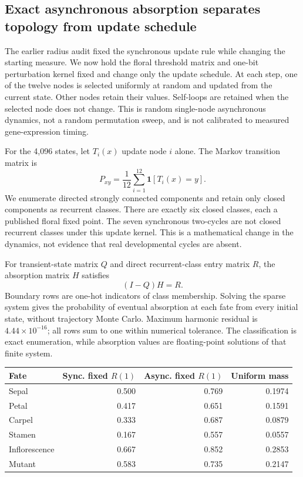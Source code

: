 \subsection{Exact asynchronous absorption separates topology from update schedule}

The earlier radius audit fixed the synchronous update rule while changing the starting measure. We now hold the floral threshold matrix and one-bit perturbation kernel fixed and change only the update schedule. At each step, one of the twelve nodes is selected uniformly at random and updated from the current state. Other nodes retain their values. Self-loops are retained when the selected node does not change. This is random single-node asynchronous dynamics, not a random permutation sweep, and is not calibrated to measured gene-expression timing.

For the 4,096 states, let $T_i(x)$ update node $i$ alone. The Markov transition matrix is
\[
P_{xy}=\frac{1}{12}\sum_{i=1}^{12}\mathbf{1}[T_i(x)=y].
\]
We enumerate directed strongly connected components and retain only closed components as recurrent classes. There are exactly six closed classes, each a published floral fixed point. The seven synchronous two-cycles are not closed recurrent classes under this update kernel. This is a mathematical change in the dynamics, not evidence that real developmental cycles are absent.

For transient-state matrix $Q$ and direct recurrent-class entry matrix $R$, the absorption matrix $H$ satisfies
\[
(I-Q)H=R.
\]
Boundary rows are one-hot indicators of class membership. Solving the sparse system gives the probability of eventual absorption at each fate from every initial state, without trajectory Monte Carlo. Maximum harmonic residual is $4.44\times10^{-16}$; all rows sum to one within numerical tolerance. The classification is exact enumeration, while absorption values are floating-point solutions of that finite system.

\begin{center}\begin{tabular}{lrrr}\hline
Fate & Sync. fixed $R(1)$ & Async. fixed $R(1)$ & Uniform mass\\\hline
Sepal & 0.500 & 0.769 & 0.1974\\
Petal & 0.417 & 0.651 & 0.1591\\
Carpel & 0.333 & 0.687 & 0.0879\\
Stamen & 0.167 & 0.557 & 0.0557\\
Inflorescence & 0.667 & 0.852 & 0.2853\\
Mutant & 0.583 & 0.735 & 0.2147\\\hline
\end{tabular}\end{center}

